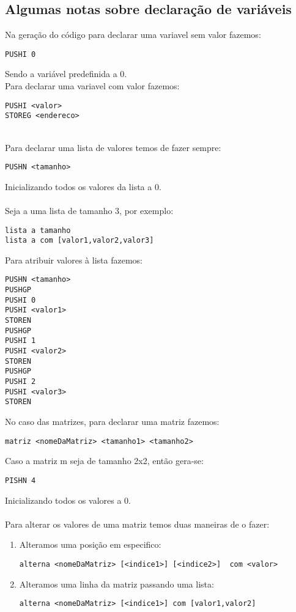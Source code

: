 \documentclass[11pt,a4paper]{report}%
\begin{document}
\subsection{Algumas notas sobre declaração de variáveis}

Na geração do código para declarar uma variavel sem valor fazemos:
\begin{lstlisting}
PUSHI 0    
\end{lstlisting}
Sendo a variável predefinida a 0.\\

Para declarar uma variavel com valor fazemos:
\begin{lstlisting}
PUSHI <valor>
STOREG <endereco>
\end{lstlisting}
\\
Para declarar uma lista de valores temos de fazer sempre:
\begin{lstlisting}
PUSHN <tamanho>
\end{lstlisting}
Inicializando todos os valores da lista a 0.\\ \\
Seja a uma lista de tamanho 3, por exemplo:
\begin{lstlisting}
lista a tamanho
lista a com [valor1,valor2,valor3]
\end{lstlisting}
Para atribuir valores à lista fazemos:
\begin{lstlisting}
PUSHN <tamanho>
PUSHGP
PUSHI 0
PUSHI <valor1>
STOREN
PUSHGP
PUSHI 1
PUSHI <valor2>
STOREN
PUSHGP
PUSHI 2
PUSHI <valor3>
STOREN 
\end{lstlisting}


No caso das matrizes, para declarar uma matriz fazemos: 
\begin{lstlisting}
matriz <nomeDaMatriz> <tamanho1> <tamanho2>    
\end{lstlisting}
Caso a matriz m seja de tamanho 2x2, então gera-se:
\begin{lstlisting}
PISHN 4
\end{lstlisting}
Inicializando todos os valores a 0. \\ \\

Para alterar os valores de uma matriz temos duas maneiras de o fazer:
\begin{enumerate}
\item Alteramos uma posição em especifico:
\begin{lstlisting}
alterna <nomeDaMatriz> [<indice1>] [<indice2>]  com <valor>    
\end{lstlisting}
\item Alteramos uma linha da matriz passando uma lista:
\begin{lstlisting}
alterna <nomeDaMatriz> [<indice1>] com [valor1,valor2]
\end{lstlisting}
\end{enumerate}
\end{document}
